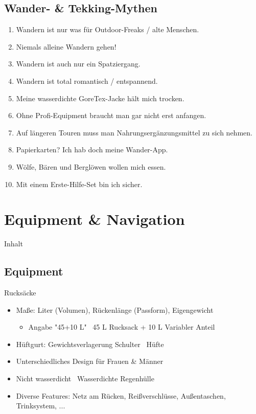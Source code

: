 \documentclass[aspectratio=169]{beamer}
\begin{document}
		\subsection{Wander- \& Tekking-Mythen}
			
			\begin{frame}{}
				\begin{enumerate}
					\item Wandern ist nur was für Outdoor-Freaks / alte Menschen.\pause
					\item Niemals alleine Wandern gehen!\pause
					\item Wandern ist auch nur ein Spatziergang.\pause
					\item Wandern ist total romantisch / entspannend.\pause
					\item Meine wasserdichte GoreTex-Jacke hält mich trocken.\pause
					\item Ohne Profi-Equipment braucht man gar nicht erst anfangen.\pause
					\item Auf längeren Touren muss man Nahrungsergänzungsmittel zu sich nehmen.\pause
					\item Papierkarten? Ich hab doch meine Wander-App.\pause
					\item Wölfe, Bären und Berglöwen wollen mich essen.\pause
					\item Mit einem Erste-Hilfe-Set bin ich sicher.
				\end{enumerate}
			\end{frame}
			
	\section{Equipment \& Navigation}
		
		\begin{frame}[t]{Inhalt}
		\end{frame}
		
		\subsection{Equipment}
		
			\begin{frame}{Rucksäcke}
				\begin{itemize}
					\item Maße: Liter (Volumen), Rückenlänge (Passform), Eigengewicht
					\begin{itemize}
						\item Angabe "45+10 L" \textrightarrow\ 45 L Rucksack + 10 L Variabler Anteil
					\end{itemize}\pause
					\item Hüftgurt: Gewichtsverlagerung Schulter \textrightarrow\ Hüfte\pause
					\item Unterschiedliches Design für Frauen \& Männer\pause
					\item Nicht wasserdicht \textrightarrow\ Wasserdichte Regenhülle\pause
					\item Diverse Features: Netz am Rücken, Reißverschlüsse, Außentaschen, Trinksystem, ...
				\end{itemize}
			\end{frame}
			
\end{document}
